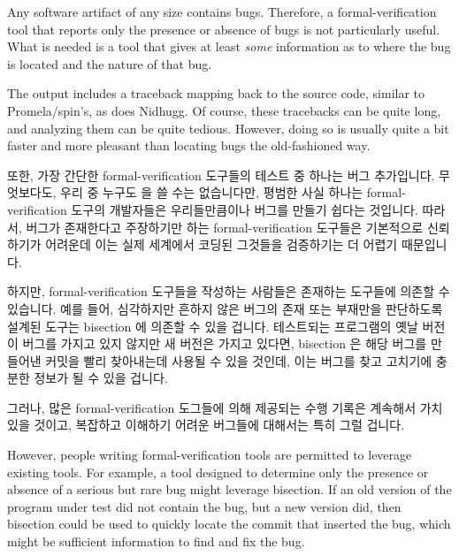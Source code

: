 Any software artifact of any size contains bugs.
Therefore, a formal-verification tool that reports only the
presence or absence of bugs is not particularly useful.
What is needed is a tool that gives at least \emph{some} information
as to where the bug is located and the nature of that bug.

The  output includes a traceback mapping back to the source
code, similar to Promela/spin's, as does Nidhugg.
Of course, these tracebacks can be quite long, and analyzing them
can be quite tedious.
However, doing so is usually quite a bit faster
and more pleasant than locating bugs the old-fashioned way.
\fi

또한, 가장 간단한 formal-verification 도구들의 테스트 중 하나는 버그
추가입니다.
무엇보다도, 우리 중 누구도  을 쓸 수는 없습니다만,
평범한 사실 하나는 formal-verification 도구의 개발자들은 우리들만큼이나 버그를
만들기 쉽다는 것입니다.
따라서, 버그가 존재한다고 주장하기만 하는 formal-verification 도구들은
기본적으로 신뢰하기가 어려운데 이는 실제 세계에서 코딩된 그것들을 검증하기는 더
어렵기 때문입니다.
\iffalse

In addition, one of the simplest tests of formal-verification tools is
bug injection.
After all, not only could any of us write
\co{printf("VERIFIED\\n")}, but the plain fact is that
developers of formal-verification tools are just as bug-prone as
are the rest of us.
Therefore, formal-verification tools that just proclaim that a
bug exists are fundamentally less trustworthy because it is
more difficult to verify them on real-world code.
\fi

하지만, formal-verification 도구들을 작성하는 사람들은 존재하는 도구들에 의존할
수 있습니다.
예를 들어, 심각하지만 흔하지 않은 버그의 존재 또는 부재만을 판단하도록 설계된
도구는 bisection 에 의존할 수 있을 겁니다.
테스트되는 프로그램의 옛날 버전이 버그를 가지고 있지 않지만 새 버전은 가지고
있다면, bisection 은 해당 버그를 만들어낸 커밋을 빨리 찾아내는데 사용될 수 있을
것인데, 이는 버그를 찾고 고치기에 충분한 정보가 될 수 있을 겁니다.

그러나, 많은 formal-verification 도그들에 의해 제공되는 수행 기록은 계속해서
가치있을 것이고, 복잡하고 이해하기 어려운 버그들에 대해서는 특히 그럴 겁니다.
\iffalse

However, people writing formal-verification tools are
permitted to leverage existing tools.
For example, a tool designed to determine only the presence
or absence of a serious but rare bug might leverage bisection.
If an old version of the program under test did not contain the bug,
but a new version did, then bisection could be used to quickly
locate the commit that inserted the bug, which might be
sufficient information to find and fix the bug.

